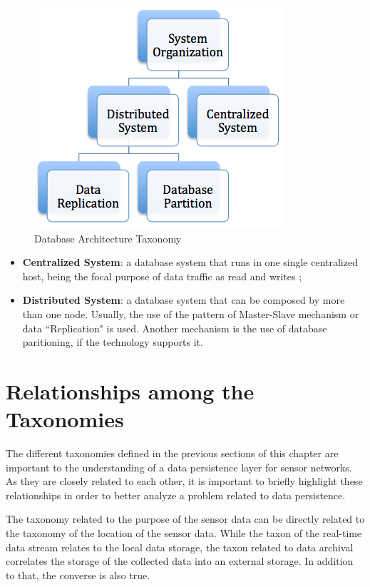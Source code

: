 \begin{figure}[h]
  \centering
  \includegraphics{../diagrams/taxonomy-database-architecture}
  \caption{Database Architecture Taxonomy}
  \label{fig:taxonomy-database-architecture}
\end{figure}

\begin{itemize}
  \item \textbf{Centralized System}: a database system that runs in one single
  centralized host, being the focal purpose of data traffic as read and writes 
  \cite{sn-intro01};
  \item \textbf{Distributed System}: a database system that can be composed by
  more than one node. Usually, the use of the pattern of Master-Slave
  mechanism or data ``Replication" is used. Another mechanism is the use of
  database paritioning, if the technology supports it.
\end{itemize}

\section{Relationships among the Taxonomies}

The different taxonomies defined in the previous sections of this chapter are
important to the understanding of a data persistence layer for sensor
networks. As they are closely related to each other, it is important to
briefly highlight these relationships in order to better analyze a problem
related to data persistence. 

The taxonomy related to the purpose of the sensor data can be directly related
to the taxonomy of the location of the sensor data. While the taxon of the 
real-time data stream relates to the local data storage, the taxon related to
data archival correlates the storage of the collected data into an external
storage. In addition to that, the converse is also true.

